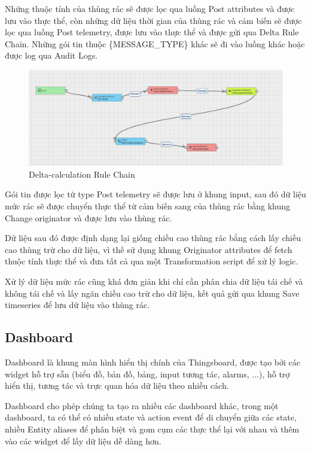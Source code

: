 Những thuộc tính của thùng rác sẽ được lọc qua luồng Post attributes và được lưu vào thực thể, còn những dữ liệu thời gian của thùng rác và cảm biến sẽ được lọc qua luồng Post telemetry, được lưu vào thực thể và được gửi qua Delta Rule Chain. Những gói tin thuộc \{MESSAGE\_TYPE\} khác sẽ đi vào luồng khác hoặc được log qua Audit Logs.

\begin{figure}[H]
    \centering
    \includegraphics[width=\textwidth]{images/Khanh/Thingsboard/Delta_rule_chain.PNG}
    \caption{Delta-calculation Rule Chain}
    \label{fig:delta_chain}
\end{figure}

Gói tin được lọc từ type Post telemetry sẽ được lưu ở khung input, sau đó dữ liệu mức rác sẽ được chuyển thực thể từ cảm biến sang của thùng rác bằng khung Change originator và được lưu vào thùng rác.

Dữ liệu sau đó được định dạng lại giống chiều cao thùng rác bằng cách lấy chiều cao thùng trừ cho dữ liệu, vì thế sử dụng khung Originator attributes để fetch thuộc tính thực thể và đưa tất cả qua một Transformation script để xử lý logic.

Xử lý dữ liệu mức rác cũng khá đơn giản khi chỉ cần phân chia dữ liệu tái chế và không tái chế và lấy ngăn chiều cao trừ cho dữ liệu, kết quả gửi qua khung Save timeseries để lưu dữ liệu vào thùng rác.

\subsection{Dashboard}
Dashboard là khung màn hình hiển thị chính của Thingsboard, được tạo bởi các widget hỗ trợ sẵn (biểu đồ, bản đồ, bảng, input tương tác, alarms, ...), hỗ trợ hiển thị, tương tác và trực quan hóa dữ liệu theo nhiều cách. 

Dashboard cho phép chúng ta tạo ra nhiều các dashboard khác, trong một dashboard, ta có thể có nhiều state và action event để di chuyển giữa các state, nhiều Entity aliases để phân biệt và gom cụm các thực thể lại với nhau và thêm vào các widget để lấy dữ liệu dễ dàng hơn.

